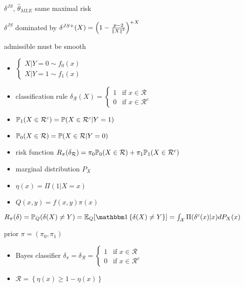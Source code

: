 \begin{fact}
    $\delta^{JS}$, $\hat\theta_{MLE}$ same maximal risk
\end{fact}

\begin{fact}
    $\delta^{JS}$ dominated by $\delta^{JS+}(X) = \left( 1  - \frac{p-2}{\left\lVert X\right\rVert^2} \right)^{+X}$
\end{fact}

\begin{fact}
    admissible must be smooth
\end{fact}

\begin{itemize}
    \item $\begin{cases}
              X|Y = 0 \sim f_0(x)   \\
                 X|Y = 1 \sim f_1(x)
    \end{cases}$
    \item classification rule $\delta_\mathcal{R}(X) = \begin{cases}
                                                           1 & \text{if }x \in \mathcal{R}\\
                                                           0 & \text{if }x \in \mathcal{R}^c
    \end{cases}$
    \item $\mathbb{P}_1(X \in \mathcal{R}^c) = \mathbb{P}(X \in \mathcal{R}^c | Y = 1)$
    \item $\mathbb{P}_0(X \in \mathcal{R}) = \mathbb{P}(X \in \mathcal{R} | Y = 0)$
    \item risk function $R_\pi(\delta_\mathcal{R}) = \pi_0\mathbb{P}_0(X \in \mathcal{R}) + \pi_1\mathbb{P}_1(X \in \mathcal{R}^c)$
    \item marginal distribution $P_X$
    \item $\eta(x) = \Pi(1|X = x)$
    \item $Q(x, y) = f(x, y)\pi(x)$
\end{itemize}

\begin{prop}
    $R_\pi(\delta) = \Pb_Q(\delta(X) \neq Y) = \Ex_Q[\In \left\{ \delta(X) \neq Y \right\}] = \int_\mathcal{X} \Pi(\delta^c(x)|x)dP_X(x)$
\end{prop}

\begin{setting}
    prior $\pi = (\pi_0, \pi_1)$
\end{setting}

\begin{itemize}
    \item Bayes classifier $\delta_\pi = \delta_\mathcal{R} = \begin{cases}
                                                                  1 & \text{if } x \in \mathcal{R}\\
                                                                  0 & \text{if } x \in \mathcal{R}^c
    \end{cases}$
    \item $\mathcal{R} = \left\{ \eta(x) \geq 1 - \eta(x) \right\}$
\end{itemize}

